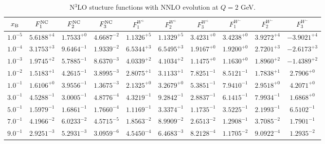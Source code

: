 \begin{table}[h]
\begin{adjustbox}{width=\textwidth}
\begin{tabular}{|c||c|c|c|c|c|c|c|c|c|}
\hline
$x_{\rm B}$ & $F_1^{\rm NC}$ & $F_2^{\rm NC}$ & $F_3^{\rm NC}$ & $F_1^{W^+}$ & $F_2^{W^+}$ & $F_3^{W^+}$ & $F_1^{W^-}$ & $F_2^{W^-}$ & $F_3^{W^-}$ \\
\hline
$ 1.0^{-5}$ & $ 5.6188^{+4}$ & $ 1.7533^{+0}$ & $ 4.6687^{-2}$ & $ 1.1326^{+5}$ & $ 1.1329^{+5}$ & $ 3.4231^{+0}$ & $ 3.4238^{+0}$ & $ 3.9272^{+4}$ & $-3.9021^{+4}$ \\
$ 1.0^{-4}$ & $ 3.1753^{+3}$ & $ 9.6464^{-1}$ & $ 1.9339^{-2}$ & $ 6.5344^{+3}$ & $ 6.5495^{+3}$ & $ 1.9167^{+0}$ & $ 1.9200^{+0}$ & $ 2.7201^{+3}$ & $-2.6173^{+3}$ \\
$ 1.0^{-3}$ & $ 1.9745^{+2}$ & $ 5.7885^{-1}$ & $ 8.6370^{-3}$ & $ 4.0339^{+2}$ & $ 4.1034^{+2}$ & $ 1.1475^{+0}$ & $ 1.1630^{+0}$ & $ 1.8960^{+2}$ & $-1.4389^{+2}$ \\
$ 1.0^{-2}$ & $ 1.5183^{+1}$ & $ 4.2615^{-1}$ & $ 3.8995^{-3}$ & $ 2.8075^{+1}$ & $ 3.1133^{+1}$ & $ 7.8251^{-1}$ & $ 8.5121^{-1}$ & $ 1.7838^{+1}$ & $ 2.7906^{+0}$ \\
$ 1.0^{-1}$ & $ 1.6106^{+0}$ & $ 3.9556^{-1}$ & $ 1.3675^{-3}$ & $ 2.1325^{+0}$ & $ 3.2679^{+0}$ & $ 5.3851^{-1}$ & $ 7.9410^{-1}$ & $ 2.9518^{+0}$ & $ 4.2071^{+0}$ \\
$ 3.0^{-1}$ & $ 4.5288^{-1}$ & $ 3.0005^{-1}$ & $ 4.8776^{-4}$ & $ 4.3219^{-1}$ & $ 9.2842^{-1}$ & $ 2.8837^{-1}$ & $ 6.1415^{-1}$ & $ 7.9934^{-1}$ & $ 1.6868^{+0}$ \\
$ 5.0^{-1}$ & $ 1.5979^{-1}$ & $ 1.6861^{-1}$ & $ 1.7660^{-4}$ & $ 1.1169^{-1}$ & $ 3.3374^{-1}$ & $ 1.1735^{-1}$ & $ 3.5225^{-1}$ & $ 2.1993^{-1}$ & $ 6.5102^{-1}$ \\
$ 7.0^{-1}$ & $ 4.1966^{-2}$ & $ 6.0233^{-2}$ & $ 4.5715^{-5}$ & $ 1.8563^{-2}$ & $ 8.9909^{-2}$ & $ 2.6513^{-2}$ & $ 1.2908^{-1}$ & $ 3.7085^{-2}$ & $ 1.7901^{-1}$ \\
$ 9.0^{-1}$ & $ 2.9251^{-3}$ & $ 5.2931^{-3}$ & $ 3.0959^{-6}$ & $ 4.5450^{-4}$ & $ 6.4683^{-3}$ & $ 8.2128^{-4}$ & $ 1.1705^{-2}$ & $ 9.0922^{-4}$ & $ 1.2935^{-2}$ \\
\hline
\end{tabular}
\end{adjustbox}\caption{N$^{3}$LO stucture functions with NNLO evolution at $Q = 2$ GeV.}
\label{tab:N3LO-Q2}
\end{table}



